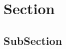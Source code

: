 \documentclass[a4paper]{article}
\begin{document}
\section{Section}

\subsection{SubSection}
\end{document}
